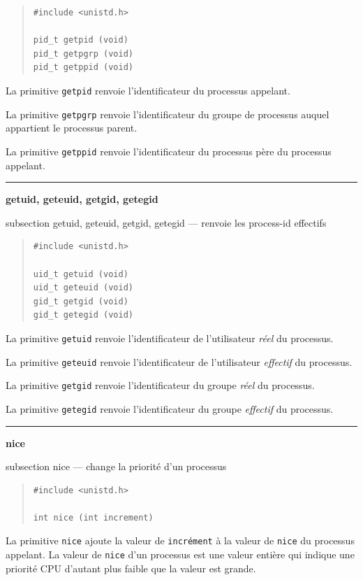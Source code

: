 \documentclass [twoside] {report}
\newcommand {\primitive} [1]
    {
	\phantomsection
	{\large \textbf {#1}}
	\addcontentsline {toc} {subsection} {#1}
    }
\newcommand {\separation}
    {
	\vspace {5mm}
	\nopagebreak
	\hrule
    }
\begin{document}
\begin {quote}
\begin {verbatim}
#include <unistd.h>

pid_t getpid (void)
pid_t getpgrp (void)
pid_t getppid (void)
\end{verbatim}
\end {quote}

La primitive \texttt {getpid} renvoie l'identificateur
du processus appelant.

La primitive \texttt {getpgrp} renvoie l'identificateur
du groupe de processus auquel appartient le
processus parent.

La primitive \texttt {getppid} renvoie l'identificateur
du processus père du processus appelant.




\separation
\primitive {getuid, geteuid, getgid, getegid} --- renvoie les process-id effectifs

\begin {quote}
\begin {verbatim}
#include <unistd.h>

uid_t getuid (void)
uid_t geteuid (void)
gid_t getgid (void)
gid_t getegid (void)
\end{verbatim}
\end {quote}

La primitive \texttt {getuid} renvoie l'identificateur
de l'utilisateur \textit {réel} du processus.

La primitive \texttt {geteuid} renvoie l'identificateur
de l'utilisateur \textit {effectif} du processus.

La primitive \texttt {getgid} renvoie l'identificateur
du groupe \textit {réel} du processus.

La primitive \texttt {getegid} renvoie l'identificateur
du groupe \textit {effectif} du processus.




\separation
\primitive {nice} --- change la priorité d'un processus

\begin {quote}
\begin {verbatim}
#include <unistd.h>

int nice (int increment)
\end{verbatim}
\end {quote}

La primitive \texttt {nice} ajoute la valeur de
\texttt {incrément} à la valeur de \texttt {nice} du processus
appelant. La valeur de \texttt {nice} d'un processus est
une valeur entière qui indique une priorité
CPU d'autant plus faible que la valeur est grande.
\end{document}

